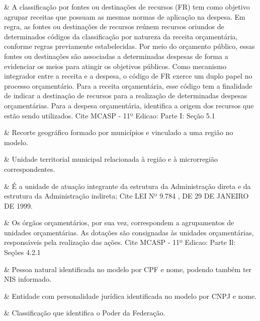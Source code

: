  &
A classificação por fontes ou destinações de recursos (FR) tem como objetivo agrupar receitas que possuam as mesmas normas de aplicação na despesa. Em regra, as fontes ou destinações de recursos reúnem recursos oriundos de determinados códigos da classificação por natureza da receita orçamentária, conforme regras previamente estabelecidas. Por meio do orçamento público, essas fontes ou destinações são associadas a determinadas despesas de forma a evidenciar os meios para atingir os objetivos públicos. Como mecanismo integrador entre a receita e a despesa, o código de FR exerce um duplo papel no processo orçamentário. Para a receita orçamentária, esse código tem a finalidade de indicar a destinação de recursos para a realização de determinadas despesas orçamentárias. Para a despesa orçamentária, identifica a origem dos recursos que estão sendo utilizados. Cite MCASP - 11º Edicao: Parte I: Seção 5.1 
\\ \hline

 &
Recorte geográfico formado por municípios e vinculado a uma região no modelo. 
\\ \hline

 &
Unidade territorial municipal relacionada à região e à microrregião correspondentes. 
\\ \hline

 &
É a unidade de atuação integrante da estrutura da Administração direta e da estrutura da Administração indireta; Cite LEI Nº 9.784 , DE 29 DE JANEIRO DE 1999. 
\\ \hline

 &
Os órgãos orçamentários, por sua vez, correspondem a agrupamentos de unidades orçamentárias. As dotações são consignadas às unidades orçamentárias, responsáveis pela realização das ações. Cite MCASP - 11º Edicao: Parte Il: Seções 4.2.1 
\\ \hline

 &
Pessoa natural identificada no modelo por CPF e nome, podendo também ter NIS informado. 
\\ \hline

 &
Entidade com personalidade jurídica identificada no modelo por CNPJ e nome. 
\\ \hline

 &
Classificação que identifica o Poder da Federação. 
\\ \hline

